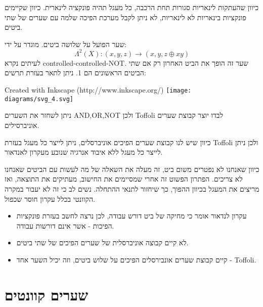 \documentclass{tstextbook}
\begin{document}
\begin{corollary}
כיוון שהעתקות לינאריות סגורות תחת הרכבה, כל מעגל תהיה פונקציה לינארית. כיוון שקיימים פונקציות בינאריות לא לינאריות, לא ניתן לקבל מערכת הפיכה שלמה עם שערים של שתי ביטים.

\end{corollary}
\begin{definition}
שער הפועל על שלושה ביטים. מוגדר על ידי:
$$\Lambda^{2}(X):(x,y,z)\longrightarrow(x,y,z\oplus x y)$$
לעיתים נקרא controlled-controlled-NOT. שער זה הופך את הביט האחרון רק אם שתי הביטים הראשונים הם 1. ניתן לתאר בעזרת תרשים:

 Created with Inkscape (http://www.inkscape.org/) \texttt{[image: diagrams/svg\_4.svg]}
\end{definition}
\begin{proposition}
ניתן לשחזר את השערים AND,OR,NOT ולכן Toffoli לבדו יוצר קבוצת שערים אוניברסילים.

\end{proposition}
\begin{corollary}
כיוון שיש לנו קבוצת שערים הפיכים אוניברסלים, ניתן לייצר כל מעגל בעזרת Toffoli ולכן ניתן לייצר כל מעגל ללא איבוד אנרגיה שנובע מעקרון לאנדאור.

\end{corollary}
\begin{remark}
כיוון שאנחנו לא נפטרים משום ביט, זה מעלה את השאלה של מה לעשות עם הביטים שאנחנו לא צריכים. הפתרון הפשוט זה אחרי שמסיימים את החישוב, מעתיקים את התוצאה, ואז מריצים את המעגל בכיוון ההפוך, כך שיחזור לתנאי ההתחלה. נשים לב כי זה לא יעבור במקרה הקוונטי בכלל עקרון חוסר שכפול.

\end{remark}
\begin{summary}
  \begin{itemize}
    \item עקרון לנדאור אומר כי מחיקה של ביט דורש עבודה, לכן נרצה לחשב בעזרת פונקציות הפיכות - אשר אינם דורשות עבודה.
    \item לא קיים קבוצה אוניברסלית של שערים הפיכים של שתי ביטים.
    \item קיים קבוצת שערים אונבירסלים הפיכים על שלוש ביטים, וזה יכיל השער אחד - Toffoli.
  \end{itemize}
\end{summary}

\section{שערים קוונטים}
\end{document}
